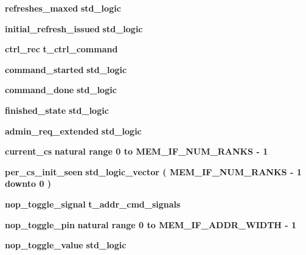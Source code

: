 \begin{DoxyCompactItemize}
\item 
{\bf refreshes\+\_\+maxed} {\bfseries \textcolor{comment}{std\+\_\+logic}\textcolor{vhdlchar}{ }} 
\item 
{\bf initial\+\_\+refresh\+\_\+issued} {\bfseries \textcolor{comment}{std\+\_\+logic}\textcolor{vhdlchar}{ }} 
\item 
{\bf ctrl\+\_\+rec} {\bfseries {\bfseries {\bf t\+\_\+ctrl\+\_\+command}} \textcolor{vhdlchar}{ }} 
\item 
{\bf command\+\_\+started} {\bfseries \textcolor{comment}{std\+\_\+logic}\textcolor{vhdlchar}{ }} 
\item 
{\bf command\+\_\+done} {\bfseries \textcolor{comment}{std\+\_\+logic}\textcolor{vhdlchar}{ }} 
\item 
{\bf finished\+\_\+state} {\bfseries \textcolor{comment}{std\+\_\+logic}\textcolor{vhdlchar}{ }} 
\item 
{\bf admin\+\_\+req\+\_\+extended} {\bfseries \textcolor{comment}{std\+\_\+logic}\textcolor{vhdlchar}{ }} 
\item 
{\bf current\+\_\+cs} {\bfseries \textcolor{comment}{natural}\textcolor{vhdlchar}{ }\textcolor{vhdlchar}{ }\textcolor{vhdlchar}{ }\textcolor{keywordflow}{range}\textcolor{vhdlchar}{ }\textcolor{vhdlchar}{ } \textcolor{vhdldigit}{0} \textcolor{vhdlchar}{ }\textcolor{keywordflow}{to}\textcolor{vhdlchar}{ }\textcolor{vhdlchar}{ }\textcolor{vhdlchar}{ }\textcolor{vhdlchar}{ }{\bfseries {\bf M\+E\+M\+\_\+\+I\+F\+\_\+\+N\+U\+M\+\_\+\+R\+A\+N\+KS}} \textcolor{vhdlchar}{-\/}\textcolor{vhdlchar}{ } \textcolor{vhdldigit}{1} \textcolor{vhdlchar}{ }} 
\item 
{\bf per\+\_\+cs\+\_\+init\+\_\+seen} {\bfseries \textcolor{comment}{std\+\_\+logic\+\_\+vector}\textcolor{vhdlchar}{ }\textcolor{vhdlchar}{(}\textcolor{vhdlchar}{ }\textcolor{vhdlchar}{ }\textcolor{vhdlchar}{ }\textcolor{vhdlchar}{ }{\bfseries {\bf M\+E\+M\+\_\+\+I\+F\+\_\+\+N\+U\+M\+\_\+\+R\+A\+N\+KS}} \textcolor{vhdlchar}{-\/}\textcolor{vhdlchar}{ } \textcolor{vhdldigit}{1} \textcolor{vhdlchar}{ }\textcolor{keywordflow}{downto}\textcolor{vhdlchar}{ }\textcolor{vhdlchar}{ } \textcolor{vhdldigit}{0} \textcolor{vhdlchar}{ }\textcolor{vhdlchar}{)}\textcolor{vhdlchar}{ }} 
\item 
{\bf nop\+\_\+toggle\+\_\+signal} {\bfseries {\bfseries {\bf t\+\_\+addr\+\_\+cmd\+\_\+signals}} \textcolor{vhdlchar}{ }} 
\item 
{\bf nop\+\_\+toggle\+\_\+pin} {\bfseries \textcolor{comment}{natural}\textcolor{vhdlchar}{ }\textcolor{vhdlchar}{ }\textcolor{vhdlchar}{ }\textcolor{keywordflow}{range}\textcolor{vhdlchar}{ }\textcolor{vhdlchar}{ } \textcolor{vhdldigit}{0} \textcolor{vhdlchar}{ }\textcolor{keywordflow}{to}\textcolor{vhdlchar}{ }\textcolor{vhdlchar}{ }\textcolor{vhdlchar}{ }\textcolor{vhdlchar}{ }{\bfseries {\bf M\+E\+M\+\_\+\+I\+F\+\_\+\+A\+D\+D\+R\+\_\+\+W\+I\+D\+TH}} \textcolor{vhdlchar}{-\/}\textcolor{vhdlchar}{ } \textcolor{vhdldigit}{1} \textcolor{vhdlchar}{ }} 
\item 
{\bf nop\+\_\+toggle\+\_\+value} {\bfseries \textcolor{comment}{std\+\_\+logic}\textcolor{vhdlchar}{ }} 
\end{DoxyCompactItemize}
